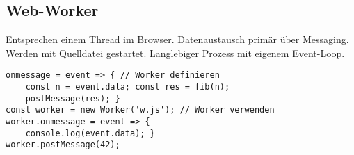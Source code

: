 \subsection{Web-Worker}
Entsprechen einem Thread im Browser. Datenaustausch primär über Messaging.
Werden mit Quelldatei gestartet. Langlebiger Prozess mit eigenem Event-Loop.
\begin{lstlisting}
onmessage = event => { // Worker definieren
    const n = event.data; const res = fib(n);
    postMessage(res); }
const worker = new Worker('w.js'); // Worker verwenden
worker.onmessage = event => {
    console.log(event.data); }
worker.postMessage(42);
\end{lstlisting}